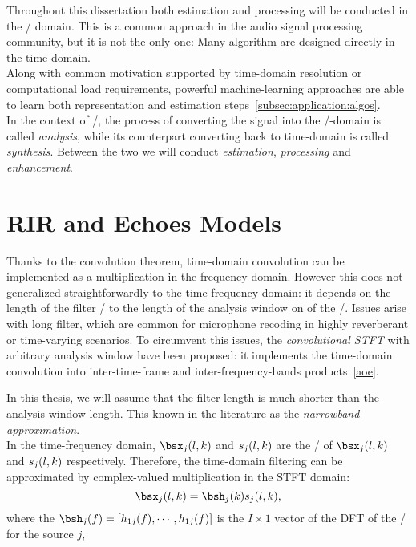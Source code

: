 Throughout this dissertation both estimation and processing will be conducted in the  \TF/ domain.
This is a common approach in the audio signal processing community, but it is not the only one:
Many algorithm are designed directly in the time domain.
\\Along with common motivation supported by time-domain resolution or computational load requirements,
powerful machine-learning approaches are able to learn both representation and estimation steps~\cref{subsec:application:algos}.
\\In the context of \STFT/, the process of converting the signal into the \TF/-domain is called \textit{analysis}, while
its counterpart converting back to time-domain is called \textit{synthesis}.
Between the two we will conduct \textit{estimation}, \textit{processing} and \textit{enhancement}.


\section{RIR and Echoes Models}
Thanks to the convolution theorem, time-domain convolution can be implemented as a multiplication in the frequency-domain.
However this does not generalized straightforwardly to the time-frequency domain:
it depends on the length of the filter \wrt/ to the length of the analysis window on of the \STFT/.
Issues arise with long filter, which are common for microphone recoding in highly reverberant or time-varying scenarios.
To circumvent this issues, the \textit{convolutional STFT} with arbitrary analysis window have been proposed:
it implements the time-domain convolution into inter-time-frame and inter-frequency-bands products~\cref{aoe}.

In this thesis, we will assume that the filter length is much shorter than the analysis window length.
This known in the literature as the \textit{narrowband approximation}\cite{}.
\\In the time-frequency domain, $\mics_j(l,k)$  and $s_j(l,k)$ are the \STFT/ of $\mics_j(l,k)$ and $s_j(l,k)$ respectively.
Therefore, the time-domain filtering can be approximated by complex-valued multiplication in the STFT domain:
\begin{equation}
    \mics_j(l,k) = \bsh_j(k) \src_j(l,k)
    ,
\end{equation}
where the $\bsh_j(f) = \klist{h_{1j}(f), \cdots, h_{1j}(f)}$ is the $I \times 1$ vector of the DFT of the
\RIRs/ for the source $j$,

